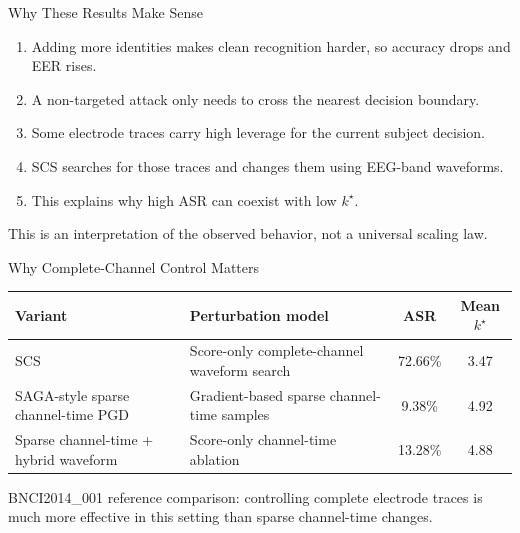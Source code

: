 \documentclass[aspectratio=169,11pt]{beamer}
\newcommand{\smallgap}{\vspace{0.45em}}
\begin{document}
\begin{frame}{Why These Results Make Sense}
\begin{enumerate}
  \item Adding more identities makes clean recognition harder, so accuracy drops and EER rises.
  \item A non-targeted attack only needs to cross the nearest decision boundary.
  \item Some electrode traces carry high leverage for the current subject decision.
  \item SCS searches for those traces and changes them using EEG-band waveforms.
  \item This explains why high ASR can coexist with low \(k^\star\).
\end{enumerate}

\smallgap
\begin{center}
\small This is an interpretation of the observed behavior, not a universal scaling law.
\end{center}
\end{frame}

\begin{frame}{Why Complete-Channel Control Matters}
\begin{table}
\centering
\footnotesize
\begin{tabular}{p{}p{}cc}
\toprule
Variant & Perturbation model & ASR & Mean \(k^\star\)\\
\midrule
SCS & Score-only complete-channel waveform search & 72.66\% & 3.47\\
SAGA-style sparse channel-time PGD & Gradient-based sparse channel-time samples & 9.38\% & 4.92\\
Sparse channel-time + hybrid waveform & Score-only channel-time ablation & 13.28\% & 4.88\\
\bottomrule
\end{tabular}
\end{table}

\begin{center}
\small BNCI2014\_001 reference comparison: controlling complete electrode traces is much more effective in this setting than sparse channel-time changes.
\end{center}
\end{frame}
\end{document}

